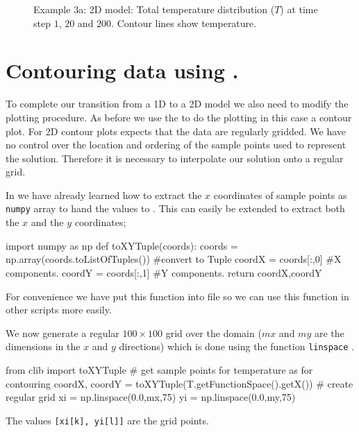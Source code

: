 \begin{figure}[ht]
\caption{Example 3a: 2D model: Total temperature distribution ($T$) at time step $1$, $20$ and $200$. Contour lines show temperature.}
\label{fig:twodhdans}
\end{figure}

\section{Contouring \esc data using \modmpl.}
\label{Sec:2DHD plot}
To complete our transition from a 1D to a 2D model we also need to modify the 
plotting procedure. As before we use the  \modmpl to do the plotting 
in this case a contour plot. For 2D contour plots \modmpl expects that the
data are regularly gridded. We have no control over the location and ordering of the sample points
used to represent the solution. Therefore it is necessary to interpolate our solution onto a regular grid.

In  we have already learned how to extract the $x$ coordinates of sample points as 
\verb|numpy| array to hand the values to \modmpl. This can easily be extended to extract both the
$x$ and the $y$ coordinates;
\begin{python}
import numpy as np
def toXYTuple(coords):
    coords = np.array(coords.toListOfTuples()) #convert to Tuple
    coordX = coords[:,0] #X components.
    coordY = coords[:,1] #Y components.
    return coordX,coordY
\end{python}
For convenience we have put this function into  file so we can use this
function in other scripts more easily. 


We now generate a regular $100 \times 100$ grid over the domain ($mx$ and $my$ 
are the dimensions in the $x$ and $y$ directions) which is done using the \modnumpy function \verb|linspace|  . 
\begin{python}
from clib import toXYTuple
# get sample points for temperature as  for contouring      
coordX, coordY = toXYTuple(T.getFunctionSpace().getX())
# create regular grid
xi = np.linspace(0.0,mx,75)
yi = np.linspace(0.0,my,75)
\end{python}
The values \verb|[xi[k], yi[l]]| are the grid points.

